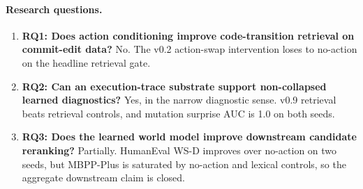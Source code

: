 \documentclass[11pt]{article}
\begin{document}
\paragraph{Research questions.}
\begin{enumerate}[leftmargin=1.5em]
  \item \textbf{RQ1: Does action conditioning improve code-transition
  retrieval on commit-edit data?} No. The v0.2 action-swap intervention loses
  to no-action on the headline retrieval gate.
  \item \textbf{RQ2: Can an execution-trace substrate support non-collapsed
  learned diagnostics?} Yes, in the narrow diagnostic sense. v0.9 retrieval
  beats retrieval controls, and mutation surprise AUC is 1.0 on both seeds.
  \item \textbf{RQ3: Does the learned world model improve downstream candidate
  reranking?} Partially. HumanEval WS-D improves over no-action on two seeds,
  but MBPP-Plus is saturated by no-action and lexical controls, so the
  aggregate downstream claim is closed.
\end{enumerate}
\end{document}
